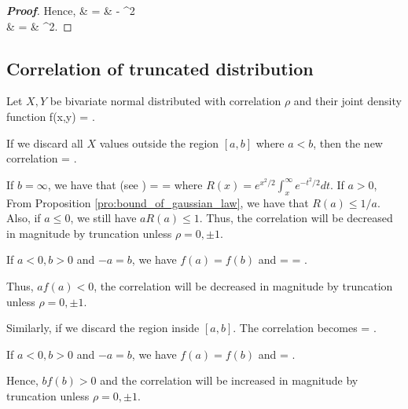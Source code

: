 \begin{proof}[\bf Proof]
Hence,
\beast
\var{} & = & \E{} - ^2 \\
& = & \sigma^2.
\eeast
\end{proof}


\subsection{Correlation of truncated distribution}

\begin{proposition}
Let $X,Y$ be bivariate normal distributed with correlation $\rho$ and their joint density function \be f(x,y) =  \exp{} . \ee

If we discard all $X$ values outside the region $[a,b]$ where $a<b$, then the new correlation \be\wh{\rho} = \rho{}.\ee
\end{proposition}

\begin{remark}
If $b=\infty$, we have that (see \cite{Aitkin_1964}) \be \wh{\rho} = \rho{} = \rho{} \ee where $R(x) = e^{x^2/2}\int^\infty_x e^{-t^2/2}dt$. If $a>0$, From Proposition \ref{pro:bound_of_gaussian_law}, we have that $R(a) \leq 1/a$. Also, if $a\leq 0$, we still have
$aR(a)\leq 1$. Thus, the correlation will be decreased in magnitude by truncation unless $\rho = 0,\pm 1$.

If $a<0,b>0$ and $-a = b$, we have $f(a) = f(b)$ and \be \wh{\rho} = \rho{} = \rho{}.\ee

Thus, $af(a) <0$, the correlation will be decreased in magnitude by truncation unless $\rho = 0,\pm 1$.

Similarly, if we discard the region inside $[a,b]$. The correlation becomes \be \wh{\rho} = \rho{}. \ee

If $a<0,b>0$ and $-a = b$, we have $f(a) = f(b)$ and \be \wh{\rho} = \rho{}.\ee

Hence, $bf(b) >0$ and the correlation will be increased in magnitude by truncation unless $\rho = 0,\pm 1$.
\end{remark}

